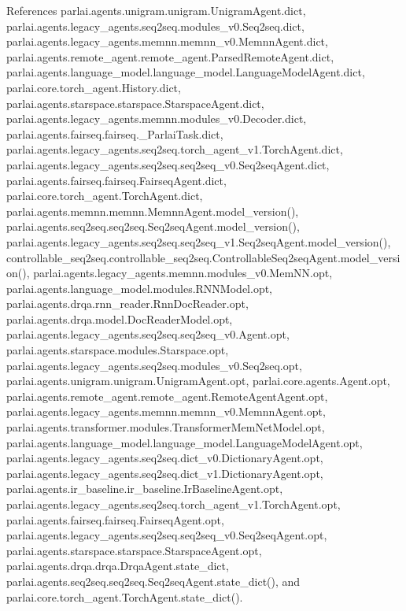 References parlai.\+agents.\+unigram.\+unigram.\+Unigram\+Agent.\+dict, parlai.\+agents.\+legacy\+\_\+agents.\+seq2seq.\+modules\+\_\+v0.\+Seq2seq.\+dict, parlai.\+agents.\+legacy\+\_\+agents.\+memnn.\+memnn\+\_\+v0.\+Memnn\+Agent.\+dict, parlai.\+agents.\+remote\+\_\+agent.\+remote\+\_\+agent.\+Parsed\+Remote\+Agent.\+dict, parlai.\+agents.\+language\+\_\+model.\+language\+\_\+model.\+Language\+Model\+Agent.\+dict, parlai.\+core.\+torch\+\_\+agent.\+History.\+dict, parlai.\+agents.\+starspace.\+starspace.\+Starspace\+Agent.\+dict, parlai.\+agents.\+legacy\+\_\+agents.\+memnn.\+modules\+\_\+v0.\+Decoder.\+dict, parlai.\+agents.\+fairseq.\+fairseq.\+\_\+\+Parlai\+Task.\+dict, parlai.\+agents.\+legacy\+\_\+agents.\+seq2seq.\+torch\+\_\+agent\+\_\+v1.\+Torch\+Agent.\+dict, parlai.\+agents.\+legacy\+\_\+agents.\+seq2seq.\+seq2seq\+\_\+v0.\+Seq2seq\+Agent.\+dict, parlai.\+agents.\+fairseq.\+fairseq.\+Fairseq\+Agent.\+dict, parlai.\+core.\+torch\+\_\+agent.\+Torch\+Agent.\+dict, parlai.\+agents.\+memnn.\+memnn.\+Memnn\+Agent.\+model\+\_\+version(), parlai.\+agents.\+seq2seq.\+seq2seq.\+Seq2seq\+Agent.\+model\+\_\+version(), parlai.\+agents.\+legacy\+\_\+agents.\+seq2seq.\+seq2seq\+\_\+v1.\+Seq2seq\+Agent.\+model\+\_\+version(), controllable\+\_\+seq2seq.\+controllable\+\_\+seq2seq.\+Controllable\+Seq2seq\+Agent.\+model\+\_\+version(), parlai.\+agents.\+legacy\+\_\+agents.\+memnn.\+modules\+\_\+v0.\+Mem\+N\+N.\+opt, parlai.\+agents.\+language\+\_\+model.\+modules.\+R\+N\+N\+Model.\+opt, parlai.\+agents.\+drqa.\+rnn\+\_\+reader.\+Rnn\+Doc\+Reader.\+opt, parlai.\+agents.\+drqa.\+model.\+Doc\+Reader\+Model.\+opt, parlai.\+agents.\+legacy\+\_\+agents.\+seq2seq.\+seq2seq\+\_\+v0.\+Agent.\+opt, parlai.\+agents.\+starspace.\+modules.\+Starspace.\+opt, parlai.\+agents.\+legacy\+\_\+agents.\+seq2seq.\+modules\+\_\+v0.\+Seq2seq.\+opt, parlai.\+agents.\+unigram.\+unigram.\+Unigram\+Agent.\+opt, parlai.\+core.\+agents.\+Agent.\+opt, parlai.\+agents.\+remote\+\_\+agent.\+remote\+\_\+agent.\+Remote\+Agent\+Agent.\+opt, parlai.\+agents.\+legacy\+\_\+agents.\+memnn.\+memnn\+\_\+v0.\+Memnn\+Agent.\+opt, parlai.\+agents.\+transformer.\+modules.\+Transformer\+Mem\+Net\+Model.\+opt, parlai.\+agents.\+language\+\_\+model.\+language\+\_\+model.\+Language\+Model\+Agent.\+opt, parlai.\+agents.\+legacy\+\_\+agents.\+seq2seq.\+dict\+\_\+v0.\+Dictionary\+Agent.\+opt, parlai.\+agents.\+legacy\+\_\+agents.\+seq2seq.\+dict\+\_\+v1.\+Dictionary\+Agent.\+opt, parlai.\+agents.\+ir\+\_\+baseline.\+ir\+\_\+baseline.\+Ir\+Baseline\+Agent.\+opt, parlai.\+agents.\+legacy\+\_\+agents.\+seq2seq.\+torch\+\_\+agent\+\_\+v1.\+Torch\+Agent.\+opt, parlai.\+agents.\+fairseq.\+fairseq.\+Fairseq\+Agent.\+opt, parlai.\+agents.\+legacy\+\_\+agents.\+seq2seq.\+seq2seq\+\_\+v0.\+Seq2seq\+Agent.\+opt, parlai.\+agents.\+starspace.\+starspace.\+Starspace\+Agent.\+opt, parlai.\+agents.\+drqa.\+drqa.\+Drqa\+Agent.\+state\+\_\+dict, parlai.\+agents.\+seq2seq.\+seq2seq.\+Seq2seq\+Agent.\+state\+\_\+dict(), and parlai.\+core.\+torch\+\_\+agent.\+Torch\+Agent.\+state\+\_\+dict().

